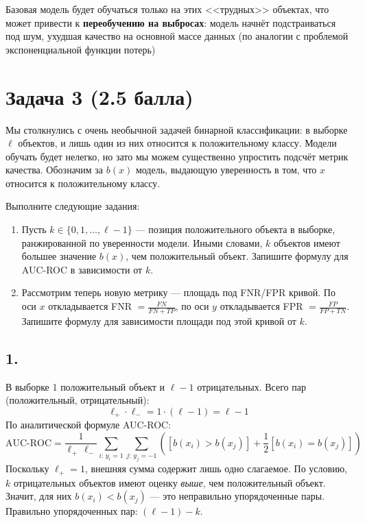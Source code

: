 \documentclass[12pt,a4paper]{article}
\begin{document}
Базовая модель будет обучаться только на этих <<трудных>> объектах, что может привести к \textbf{переобучению на выбросах}: модель начнёт подстраиваться под шум, ухудшая качество на основной массе данных (по аналогии с проблемой экспоненциальной функции потерь)

\section*{Задача 3 (2.5 балла)}

Мы столкнулись с очень необычной задачей бинарной классификации: в выборке $\ell$ объектов, и лишь один из них относится к положительному классу. Модели обучать будет нелегко, но зато мы можем существенно упростить подсчёт метрик качества. Обозначим за $b(x)$ модель, выдающую уверенность в том, что $x$ относится к положительному классу.

Выполните следующие задания:

\begin{enumerate}
\item Пусть $k \in \{0, 1, \ldots, \ell-1\}$ --- позиция положительного объекта в выборке, ранжированной по уверенности модели. Иными словами, $k$ объектов имеют большее значение $b(x)$, чем положительный объект. Запишите формулу для AUC-ROC в зависимости от $k$.

\item Рассмотрим теперь новую метрику --- площадь под FNR/FPR кривой. По оси $x$ откладывается FNR $= \frac{FN}{FN+TP}$, по оси $y$ откладывается FPR $= \frac{FP}{FP+TN}$. Запишите формулу для зависимости площади под этой кривой от $k$.
\end{enumerate}

\subsection*{1.}

В выборке 1 положительный объект и $\ell - 1$ отрицательных. Всего пар (положительный, отрицательный):
\[
\ell_+ \cdot \ell_- = 1 \cdot (\ell - 1) = \ell - 1
\]
По аналитической формуле AUC-ROC:
\[
\text{AUC-ROC} = \frac{1}{\ell_+\,\ell_-}\sum_{i:\,y_i=1}\sum_{j:\,y_j=-1}\left([b(x_i) > b(x_j)] + \frac{1}{2}[b(x_i) = b(x_j)]\right)
\]
Поскольку $\ell_+ = 1$, внешняя сумма содержит лишь одно слагаемое. По условию, $k$ отрицательных объектов имеют оценку \textit{выше}, чем положительный объект. Значит, для них $b(x_i) < b(x_j)$ --- это неправильно упорядоченные пары. Правильно упорядоченных пар: $(\ell - 1) - k$.
\end{document}
